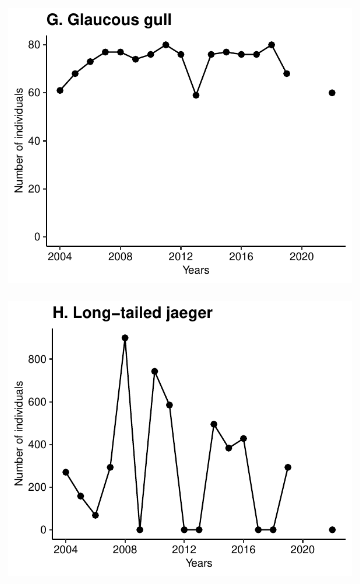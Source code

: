 \documentclass[a4paper,twoside,12pt]{article}
\begin{document}
\begin{figure}[h]
\begin{subfigure}{0.45\textwidth}
    \includegraphics[width=\linewidth]{figures/species_temporal_series/Glaucous_gull.pdf}
  \end{subfigure}
  \begin{subfigure}{0.45\textwidth}
    \includegraphics[width=\linewidth]{figures/species_temporal_series/Long-tailed_jaeger.pdf}
  \end{subfigure}
\end{figure}
\newpage
\end{document}
